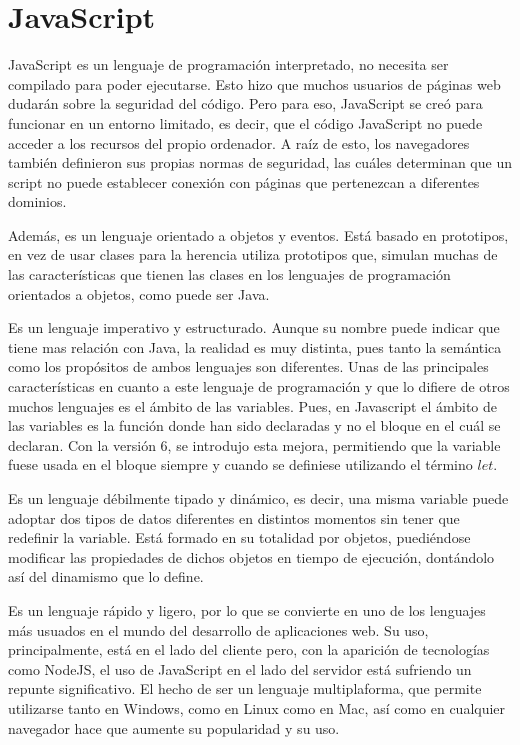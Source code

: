 \documentclass[a4paper, 12pt]{book}
\begin{document}
\section{JavaScript} 
\label{sec:JavaScript}

JavaScript es un lenguaje de programación interpretado, no necesita ser compilado para poder ejecutarse. Esto hizo que muchos usuarios de páginas web dudarán sobre la seguridad del código. Pero para eso, JavaScript se creó para funcionar en un entorno limitado, es decir, que el código JavaScript no puede acceder a los recursos del propio ordenador. A raíz de esto, los navegadores también definieron sus propias normas de seguridad, las cuáles determinan que un script no puede establecer conexión con páginas que pertenezcan a diferentes dominios. 

Además, es un lenguaje orientado a objetos y eventos. Está basado en prototipos, en vez de usar clases para la herencia utiliza prototipos que, simulan muchas de las características que tienen las clases en los lenguajes de programación orientados a objetos, como puede ser Java. 

Es un lenguaje imperativo y estructurado. Aunque su nombre puede indicar que tiene mas relación con Java, la realidad es muy distinta, pues tanto la semántica como los propósitos de ambos lenguajes son diferentes. Unas de las principales características en cuanto a este lenguaje de programación y que lo difiere de otros muchos lenguajes es el ámbito de las variables. Pues, en Javascript el ámbito de las variables es la función donde han sido declaradas y no el bloque en el cuál se declaran. Con la versión 6, se introdujo esta mejora, permitiendo que la variable fuese usada en el bloque siempre y cuando se definiese utilizando el término $let$.  
 
Es un lenguaje débilmente tipado y dinámico, es decir, una misma variable puede adoptar dos tipos de datos diferentes en distintos momentos sin tener que redefinir la variable. Está formado en su totalidad por objetos, puediéndose modificar las propiedades de dichos objetos en tiempo de ejecución, dontándolo así del dinamismo que lo define.  

Es un lenguaje rápido y ligero, por lo que se convierte en uno de los lenguajes más usuados en el mundo del desarrollo de aplicaciones web. Su uso, principalmente, está en el lado del cliente pero, con la aparición de tecnologías como NodeJS, el uso de JavaScript en el lado del servidor está sufriendo un repunte significativo. El hecho de ser un lenguaje multiplaforma, que permite utilizarse tanto en Windows, como en Linux como en Mac, así como en cualquier navegador hace que aumente su popularidad y su uso. 
\end{document}
